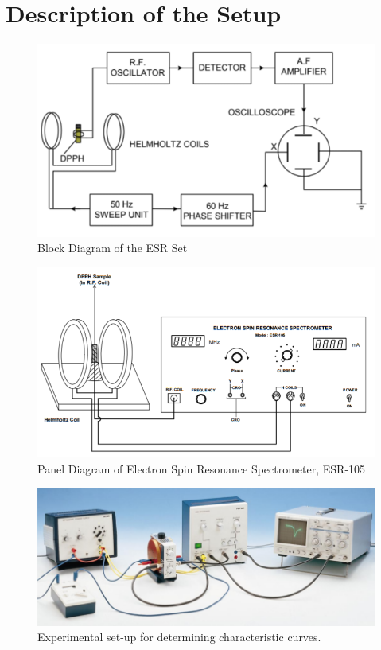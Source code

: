 \documentclass[%
 reprint,
nofootinbib,
 amsmath,amssymb,
 aps,
floatfix,
]{revtex4-2}
\begin{document}
\section{\label{sec:setup}Description of the Setup}
    \begin{figure}
        \centering
        \includegraphics[scale = 0.75]{Figures/blockdgESR.png}
        \caption{ Block Diagram of the ESR Set}
        \label{fig:block}
    \end{figure}
    \begin{figure}
        \centering
        \includegraphics[scale = 1]{Figures/paneldgESR.png}
        \caption{Panel Diagram of Electron Spin Resonance Spectrometer, ESR-105}
        \label{fig:panel}
    \end{figure}
    \begin{figure}
        \centering
        \includegraphics[scale = 0.4]{Figures/setupcharactcurves.png}
        \caption{Experimental set-up for determining characteristic curves.}
        \label{fig:characurves}
    \end{figure}
\end{document}
